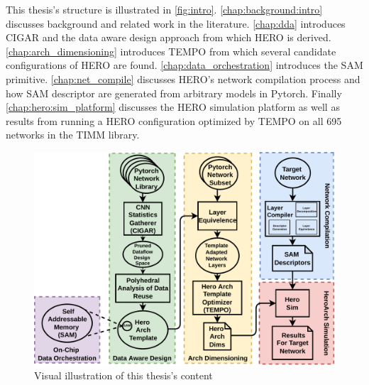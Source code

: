 This thesis's structure is illustrated in \autoref{fig:intro}.
\autoref{chap:background:intro} discusses background and related work in the
literature. \autoref{chap:dda} introduces \ac{CIGAR} and the data aware design
approach from which \ac{HERO} is derived. \autoref{chap:arch_dimensioning}
introduces \ac{TEMPO} from which several candidate configurations of HERO are
found. \autoref{chap:data_orchestration} introduces the SAM primitive. 
\autoref{chap:net_compile} discusses HERO's network compilation process
and how SAM descriptor are generated from arbitrary models in Pytorch. Finally
\autoref{chap:hero:sim_platform} discusses the HERO simulation platform as well
as results from running a HERO configuration optimized by TEMPO on all 695
networks in the TIMM library. 

\begin{figure}[ht]
  \centering
  \includegraphics[scale=0.6]{fig/intro.pdf}
  \caption{Visual illustration of this thesis's content}
  \label{fig:intro}
\end{figure}